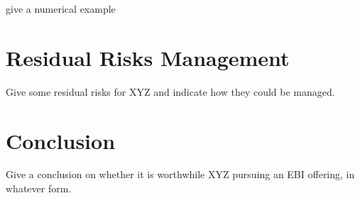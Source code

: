 \documentclass[12pt]{article}
\begin{document}
give a numerical example
\frameboxend

\section{Residual Risks Management}
Give some residual risks for XYZ and indicate how they could be managed. 

\section{Conclusion}
Give a conclusion on whether it is worthwhile XYZ pursuing an EBI offering, in whatever form. 
\newpage
\printbibliography[heading=bibintoc]
\end{document}
